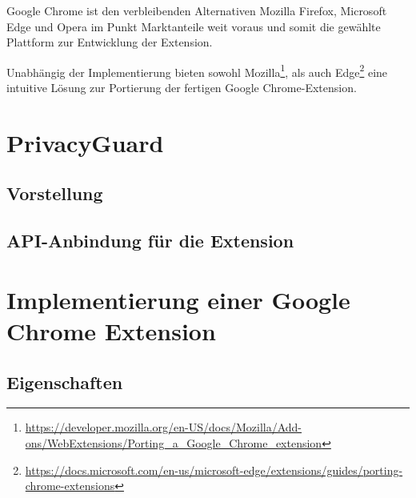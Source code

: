 Google Chrome ist den verbleibenden Alternativen Mozilla Firefox, Microsoft Edge und Opera im Punkt Marktanteile weit voraus und somit die gewählte Plattform zur Entwicklung der Extension.

Unabhängig der Implementierung bieten sowohl Mozilla\footnote{\url{https://developer.mozilla.org/en-US/docs/Mozilla/Add-ons/WebExtensions/Porting_a_Google_Chrome_extension}}, als auch Edge\footnote{\url{https://docs.microsoft.com/en-us/microsoft-edge/extensions/guides/porting-chrome-extensions}} eine intuitive Lösung zur Portierung der fertigen Google Chrome-Extension.

\section{PrivacyGuard}
\label{s:pguard}

\subsection{Vorstellung}
\label{ss:vorstellung}

\subsection{API-Anbindung für die Extension}
\label{ss:apianbindung}


\section{Implementierung einer Google Chrome Extension}
\label{s:implementierung}

\subsection{Eigenschaften}
\label{ss:eigenschaften}

